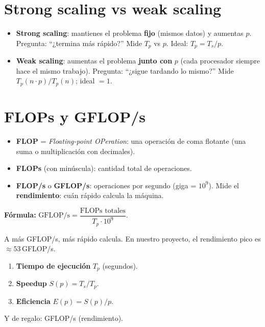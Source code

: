 \documentclass[11pt,a4paper]{article}
\newcommand{\term}[1]{\textbf{\textcolor{clave}{#1}}}
\begin{document}
\section{Strong scaling vs weak scaling}

\begin{itemize}
  \item \term{Strong scaling}: mantienes el problema \textbf{fijo} (mismos datos)
        y aumentas $p$. Pregunta: ``¿termina más rápido?'' Mide $T_p$ vs $p$.
        Ideal: $T_p = T_s/p$.
  \item \term{Weak scaling}: aumentas el problema \textbf{junto con} $p$ (cada
        procesador siempre hace el mismo trabajo). Pregunta: ``¿sigue tardando lo
        mismo?'' Mide $T_p(n\cdot p)/T_p(n)$; ideal $=1$.
\end{itemize}

\section{FLOPs y GFLOP/s}

\begin{itemize}
  \item \term{FLOP} = \emph{Floating-point OPeration}: una operación de coma
        flotante (una suma o multiplicación con decimales).
  \item \term{FLOPs} (con minúscula): cantidad total de operaciones.
  \item \term{FLOP/s} o \term{GFLOP/s}: operaciones por segundo (giga =
        $10^9$). Mide el \textbf{rendimiento}: cuán rápido calcula la máquina.
\end{itemize}

\textbf{Fórmula:} $\text{GFLOP/s} = \dfrac{\text{FLOPs totales}}{T_p \cdot 10^9}$.

A más GFLOP/s, más rápido calcula. En nuestro proyecto, el rendimiento pico es
$\approx 53$\,GFLOP/s.

\begin{importante}[title=\textbf{Las 3 métricas que pide el enunciado}]
\begin{enumerate}
  \item \textbf{Tiempo de ejecución} $T_p$ (segundos).
  \item \textbf{Speedup} $S(p)=T_s/T_p$.
  \item \textbf{Eficiencia} $E(p)=S(p)/p$.
\end{enumerate}
Y de regalo: GFLOP/s (rendimiento).
\end{importante}
\end{document}
